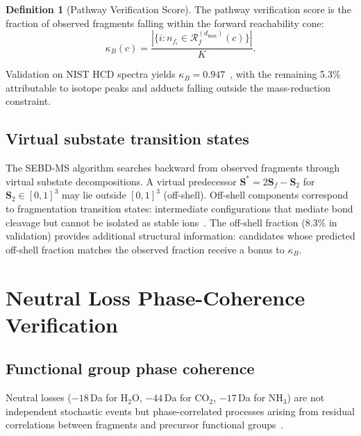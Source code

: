 \documentclass[twocolumn,10pt,a4paper]{article}
\theoremstyle{thmstyle}
\theoremstyle{definition}
\newtheorem{definition}[theorem]{Definition}
\theoremstyle{remark}
\newcommand{\Sv}{\mathbf{S}}
\newcommand{\calR}{\mathcal{R}}
\begin{document}
\begin{definition}[Pathway Verification Score]
\label{def:pathway-score}
The pathway verification score is the fraction of observed fragments
falling within the forward reachability cone:
\begin{equation}
\kappa_B(c) = \frac{|\{i : n_{f_i} \in \calR_f^{(d_{\max})}(c)\}|}{K}.
\label{eq:kappa-b}
\end{equation}
\end{definition}

Validation on NIST HCD spectra yields
$\kappa_B = 0.947$~\citep{sachikonye2024partition}, with the remaining
5.3\% attributable to isotope peaks and adducts falling outside the
mass-reduction constraint.

\subsection{Virtual substate transition states}

The SEBD-MS algorithm searches backward from observed fragments through
virtual substate decompositions. A virtual predecessor
$\Sv^* = 2\Sv_f - \Sv_2$ for $\Sv_2 \in [0,1]^3$ may lie outside
$[0,1]^3$ (off-shell). Off-shell components correspond to
fragmentation transition states: intermediate configurations that
mediate bond cleavage but cannot be isolated as stable
ions~\citep{sachikonye2024partition}. The off-shell fraction
(8.3\% in validation) provides additional structural information:
candidates whose predicted off-shell fraction matches the observed
fraction receive a bonus to $\kappa_B$.


\section{Neutral Loss Phase-Coherence Verification}
\label{sec:neutralloss}

\subsection{Functional group phase coherence}

Neutral losses ($-18$\,Da for H$_2$O, $-44$\,Da for CO$_2$,
$-17$\,Da for NH$_3$) are not independent stochastic events but
phase-correlated processes arising from residual correlations between
fragments and precursor functional
groups~\citep{sachikonye2024categorical}.
\end{document}
